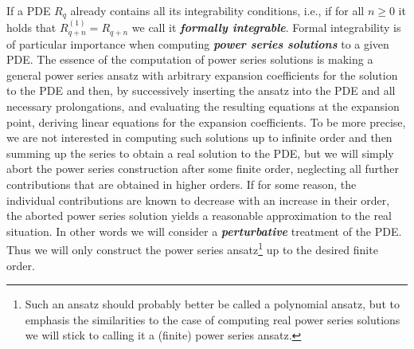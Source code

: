 If a PDE $R_q$ already contains all its integrability conditions, i.e., if for all $n\geq 0$ it holds that $R_{q+n}^{(1)} = R_{q+n}$ we call it \textit{\textbf{formally integrable}}.
Formal integrability is of particular importance when computing \textbf{\textit{power series solutions}} to a given PDE. The essence of the computation of power series solutions is making a general power series ansatz with arbitrary expansion coefficients for the solution to the PDE and then, by successively inserting the ansatz into the PDE and all necessary prolongations, and evaluating the resulting equations at the expansion point, deriving linear equations for the expansion coefficients. 
To be more precise, we are not interested in computing such solutions up to infinite order and then summing up the series to obtain a real solution to the PDE, but we will simply abort the power series construction after some finite order, neglecting all further contributions that are obtained in higher orders.
If for some reason, the individual contributions are known to decrease with an increase in their order, the aborted power series solution yields a reasonable approximation to the real situation. 
In other words we will consider a \textit{\textbf{perturbative}} treatment of the PDE.
Thus we will only construct the power series ansatz\footnote{Such an ansatz should probably better be called a polynomial ansatz, but to emphasis the similarities to the case of computing real power series solutions we will stick to calling it a (finite) power series ansatz.} up to the desired finite order.

